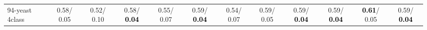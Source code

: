 \begin{table}[h]
\begin{center}
{\begin{tabular}{lc|c|c|c|c|c|c|c|c|c|c}
94-yeast 4class &   0.58/  0.05 &   0.52/  0.10 &   0.58/\textcolor{black}{\textbf{  0.04}} &   0.55/  0.07 &   0.59/\textcolor{black}{\textbf{  0.04}} &   0.54/  0.07 &   0.59/  0.05 &   0.59/\textcolor{black}{\textbf{  0.04}} &   0.59/\textcolor{black}{\textbf{  0.04}} & \textcolor{black}{\textbf{  0.61}}/  0.05 &   0.59/\textcolor{black}{\textbf{  0.04}} \\\end{tabular}}\label{stratsBalAcc2bSVM}
\end{center}
\end{table}